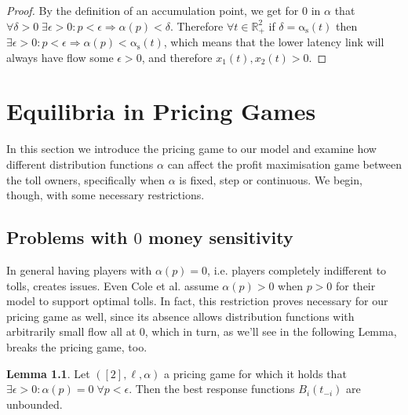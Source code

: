 \documentclass[10pt,a4paper]{book}
\newcommand{\as}{\mathrm{\alpha_s}}
\newcommand{\R}{\mathbb{R}}
\theoremstyle{definition}
\newtheorem{lemma}[definition]{Lemma}
\theoremstyle{comment}
\begin{document}
\begin{proof}
	By the definition of an accumulation point, we get for $0$ in $\alpha$ that $\forall \delta > 0 \; \exists \epsilon > 0: p < \epsilon \Rightarrow \alpha(p) < \delta$.
	Therefore $\forall t \in \R_+^2$ if $\delta = \as(t)$ then $\exists \epsilon > 0: p < \epsilon \Rightarrow \alpha(p) < \as(t)$, which means that the lower latency link will always have flow some $\epsilon > 0$, and therefore $x_1(t), x_2(t) > 0$.
\end{proof}

\cleardoublepage


\chapter{Equilibria in Pricing Games}

In this section we introduce the pricing game to our model and examine how different distribution functions $\alpha$ can affect the profit maximisation game between the toll owners, specifically when $\alpha$ is fixed, step or continuous.
We begin, though, with some necessary restrictions.

\section{Problems with $0$ money sensitivity}

In general having players with $\alpha(p) = 0$, i.e. players completely indifferent to tolls, creates issues.
Even Cole et al. \cite{10.1145/780542.780618} assume $\alpha(p) > 0$ when $p > 0$ for their model to support optimal tolls.
In fact, this restriction proves necessary for our pricing game as well, since its absence allows distribution functions with arbitrarily small flow all at $0$, which in turn, as we'll see in the following Lemma, breaks the pricing game, too.

\begin{lemma}
	\label{lemma:a_0_0}
	Let $([2], \ell, \alpha)$ a pricing game for which it holds that $\exists \epsilon > 0: \alpha(p) = 0 \; \forall p < \epsilon$.
	Then the best response functions $B_i(t_{-i})$ are unbounded.
\end{lemma}
\end{document}
